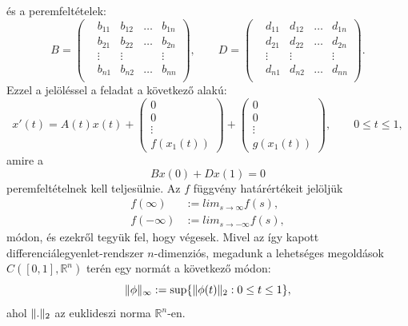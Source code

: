 \documentclass[oneside, titlepage, 12pt, a4paper]{report}
\DeclarePairedDelimiter\norm{\lVert}{\rVert}	%
\begin{document}
és a peremfeltételek:
\begin{equation*}
B =  \left(
\begin{matrix}
&b_{11} &b_{12} &\dots &b_{1n} \\
&b_{21} &b_{22} &\dots &b_{2n} \\
&\vdots &\vdots & &\vdots \\
&b_{n1} &b_{n2} &\dots &b_{nn} \\
\end{matrix}
\right), \qquad
D = \left(
\begin{matrix}
&d_{11} &d_{12} &\dots &d_{1n} \\
&d_{21} &d_{22} &\dots &d_{2n} \\
&\vdots &\vdots & &\vdots \\
&d_{n1} &d_{n2} &\dots &d_{nn} \\
\end{matrix}
\right).
\end{equation*}
Ezzel a jelöléssel a feladat a következő alakú:
\begin{equation}
x'(t) = A(t) x(t) + \left(
\begin{array}{c}
0 \\
0 \\
\vdots \\
f(x_1(t))
\end{array}
\right) + \left(
\begin{array}{c}
0 \\
0 \\
\vdots \\
g(x_1(t))
\end{array}
\right), \qquad 0 \le t \le 1,
\end{equation}
amire a
\begin{equation}
Bx(0) + Dx(1) = 0
\end{equation}
peremfeltételnek kell teljesülnie. Az $f$ függvény határértékeit jelöljük
\begin{align*}
f(\infty) &:= lim_{s \to \infty} f(s), \\
f(-\infty) &:= lim_{s \to -\infty} f(s),
\end{align*}
módon, és ezekről tegyük fel, hogy végesek. Mivel az így kapott differenciálegyenlet-rendszer $n$-dimenziós, megadunk a lehetséges megoldások $C([0, 1],\mathbb{R}^n)$ terén egy normát a következő módon:
\begin{equation*}
\norm{\phi}_\infty := \sup \{ \norm{\phi(t)}_2 : 0 \le t \le 1 \},
\end{equation*}
ahol $\norm{.}_2$ az euklideszi norma $\mathbb{R}^n$-en. \par
\end{document}
